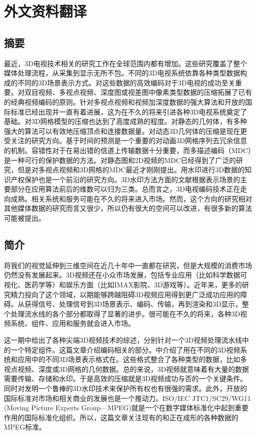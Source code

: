 
\chapter{外文资料翻译}

\section{摘要}

最近，3D电视技术相关的研究工作在全球范围内都有增加。这些研究覆盖了整个媒体处理流程，从采集到显示无所不包。不同的3D电视系统依靠各种类型数据构成的不同的3D场景表示方式。对这些数据的高效编码对于3D电视的成功至关重要。对双目视频、多视点视频、深度图或视差图中像素类型数据的压缩拓展了已有的经典视频编码的原则。针对多视点视频和视频加深度数据的强大算法和开放的国际标准已经出现并一直有着进展，这为在不久的将来引进各种3D电视系统奠定了基础。对3D网格模型的压缩也达到了高度成熟的程度。对静态的几何体，有多种强大的算法可以有效地压缩顶点和连接数据量。对动态3D几何体的压缩是现在更受关注的研究方向。基于时间的预测是一个重要的对动画3D网格序列去冗余信息的机制。容错性对于在易出错的信道上传输数据十分重要，而多描述编码（MDC）是一种可行的保护数据的方法。对静态图和2D视频的MDC已经得到了广泛的研究，但是对多视点视频和3D网格的MDC最近才刚刚提出。用水印进行3D数据的知识产权保护也是一个前沿的研究方向。3D水印方法方面的文献根据表示场景的主要部分在应用算法前后的维数可以归为三类。总而言之，3D电视编码技术正在走向成熟。相关系统和服务可能在不久的将来进入市场。然而，这个方向的研究相对其他媒体数据的研究而言又很少，所以仍有很大的空间可以改进，有很多新的算法可能被提出。

\section{简介}

将我们的视觉延伸到三维空间在近几十年中一直都在研究，但是大规模的消费市场仍然没有发展起来。3D视频还在小众市场发展，包括专业应用（比如科学数据可视化、医药学等）和娱乐方面（比如IMAX影院、3D游戏等）。近年来，更多的研究精力投向了这个领域，以期能够跨越阻碍3D视频应用得到更广泛成功应用的障碍\cite{smolic20063d, onural2004overview, smolic20043dav, smolic2005interactive, onural2006assessment}。从获得信号、处理信号到3D场景表示、编码、传输，再到渲染和3D显示，整个处理流水线的各个部分都取得了显著的进步。很可能在不久的将来，各种3D视频系统、组件、应用和服务就会进入市场。

这一期中给出了各种尖端3D视频技术的综述，分别针对一个3D视频处理流水线中的一个特定组件。这篇文章介绍编码相关的部分。中介绍了用在不同的3D视频系统和应用中的不同3D场景表示格式在。这些格式整合了各种类型的数据，比如多视点视频、深度或3D网格的几何数据。总的来说，3D视频就意味着有大量的数据需要传输、存储和水印。于是高效的压缩就是3D视频成功与否的一个关键条件。同时对发明一个鲁棒的3D水印技术来保护所有权也有很强的需求。此外，开放的国际标准对市场和相关商业的发展也是一个推动力。ISO/IEC JTC1/SC29/WG11 (Moving Picture Experts Group—MPEG)就是一个在数字媒体标准化中起到重要作用的国际标准化组织。所以，这篇文章关注现有的和正在成形的各种数据的MPEG标准。

